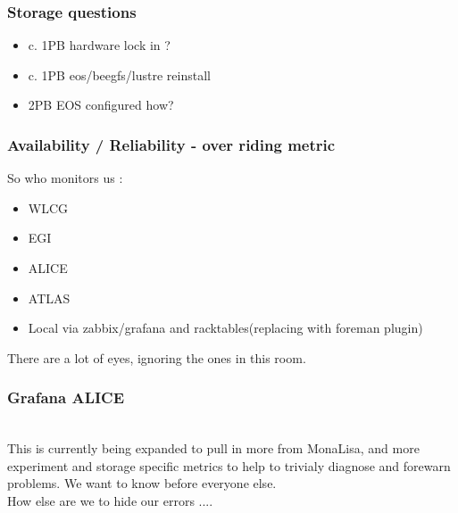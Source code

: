 \documentclass{beamer}
\begin{document}
\begin{frame}
\frametitle{Storage questions}
    \begin{itemize}
        \item c. 1PB hardware lock in ?
        \item c. 1PB eos/beegfs/lustre reinstall
        \item 2PB EOS configured how?
    \end{itemize}
\end{frame}


\begin{frame}
  \frametitle{Availability / Reliability - over riding metric}
  So who monitors us :
  \begin{itemize}
    \item WLCG
    \item EGI
    \item ALICE
    \item ATLAS
    \item Local via zabbix/grafana and racktables(replacing with foreman plugin)
  \end{itemize}
There are a lot of eyes, ignoring the ones in this room.\\
\vspace{0.5cm}
\vspace{0.5cm}
\end{frame}

\begin{frame}
  \frametitle{Grafana ALICE}
  \\
  This is currently being expanded to pull in more from MonaLisa, and more experiment and storage specific
  metrics to help to trivialy diagnose and forewarn problems. We want to know before everyone else.\\
    How else are we to hide our errors ....
\end{frame}
\end{document}
